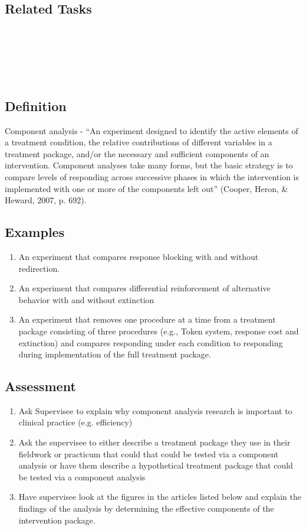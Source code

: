 \subsection{Related Tasks}
\fourbThree{}\\
\fourbSeven{}\\
\fourhOne{}\\
\fouriFive{}\\
%
%
%
%
%
\section[\fourbTen{}]{\fourbTen{}%
              }
\subsection{Definition}
Component analysis - ``An experiment designed to identify the active elements of a treatment condition, the relative contributions of different variables in a treatment package, and/or the necessary and sufficient components of an intervention. Component analyses take many forms, but the basic strategy is to compare levels of responding across successive phases in which the intervention is implemented with one or more of the components left out'' (Cooper, Heron, \& Heward, 2007, p. 692).
%
\subsection{Examples}
\begin{enumerate}
\item An experiment that compares response blocking with and without redirection. 
\item An experiment that compares differential reinforcement of alternative behavior with and without extinction
\item An experiment that removes one procedure at a time from a treatment package consisting of three procedures (e.g., Token system, response cost and extinction) and compares responding under each condition to responding during implementation of the full treatment package. 
\end{enumerate}
%
\subsection{Assessment}
\begin{enumerate}
\item Ask Supervisee to explain why component analysis research is important to clinical practice (e.g. efficiency)
\item Ask the supervisee to either describe a treatment package they use in their fieldwork or practicum that could that could be tested via a component analysis or have them describe a hypothetical treatment package that could be tested via a component analysis 
\item Have supervisee look at the figures in the articles listed below and explain the findings of the analysis by determining the effective components of the intervention package.
\end{enumerate}
%
